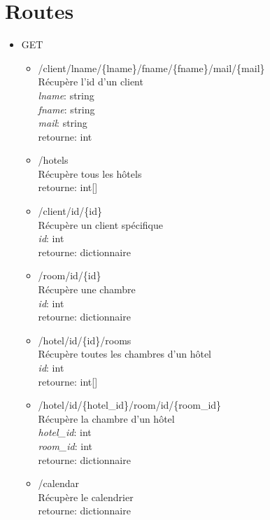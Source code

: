 \documentclass{article}
\begin{document}
\section{Routes}
\begin{itemize}

	\item GET
	\begin{itemize}
	\item /client/lname/\{lname\}/fname/\{fname\}/mail/\{mail\}\\
		R\'ecup\`ere l'id d'un client \\
		\textit{lname}: string \\
		\textit{fname}: string \\
		\textit{mail}: string \\
		retourne: int

	\item /hotels\\
		R\'ecup\`ere tous les h\^{o}tels \\
		retourne: int[]

	\item /client/id/\{id\}\\
		R\'ecup\`ere un client sp\'ecifique \\
		\textit{id}: int \\
		retourne: dictionnaire

	\item /room/id/\{id\}\\
		R\'ecup\`ere une chambre\\
		\textit{id}: int \\
		retourne: dictionnaire

	\item /hotel/id/\{id\}/rooms\\
		R\'ecup\`ere toutes les chambres d'un h\^{o}tel\\
		\textit{id}: int \\
		retourne: int[]

	\item /hotel/id/\{hotel\_id\}/room/id/\{room\_id\}\\
		R\'ecup\`ere la chambre d'un h\^{o}tel \\
		\textit{hotel\_id}: int \\
		\textit{room\_id}: int \\
		retourne: dictionnaire

	\item /calendar\\
		R\'ecup\`ere le calendrier \\
		retourne: dictionnaire


\end{itemize}
\end{itemize}
\end{document}
